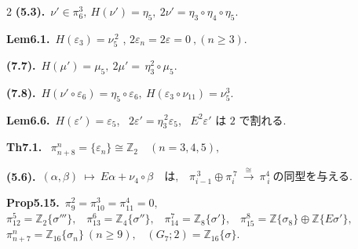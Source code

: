 \documentclass[10pt, leqno]{ltjsarticle}
\newcommand{\ov}[1]{\overline{#1}}
\newcommand{\gen}[1]{\{#1\}}       %
\newcommand{\pit}[2]{\pi_{#1}^{#2}}
\numberwithin{equation}{section}
\theoremstyle{plain}
\theoremstyle{definition}
\theoremstyle{remark}
\begin{document}
\begin{paracol}{2}
\noindent
\textbf{(5.3).}\
\(\nu'\in\pi_6^3,\ H(\nu')=\eta_5,\ 2\nu'=\eta_3\circ\eta_4\circ\eta_5 .\)

\noindent
\textbf{Lem6.1.}\
\(H(\varepsilon_3)=\nu_5^{\,2}\) , 
\(2\varepsilon_n=2\varepsilon=0\ ,(n\ge3)\). 

\noindent
\textbf{(7.7).}\
\(H(\mu')=\mu_{5},\ 2\mu'=\,\eta_{3}^{2}\circ \mu_{5} .\)

\noindent
\textbf{(7.8).}\
\(H(\nu'\circ \varepsilon_{6})=\eta_{5}\circ \varepsilon_{6},\
H(\varepsilon_{3}\circ \nu_{11})=\nu_{5}^{3} .\)

\noindent
\textbf{Lem6.6.}\
\(H(\varepsilon')=\varepsilon_{5}\), \
\(2\varepsilon'=\eta_{3}^{\,2}\varepsilon_{5}\), \
\(E^{2}\varepsilon'\) は $2$ で割れる. 

\noindent
\textbf{Th7.1.}\
\(\pit{n+8}{n}=\gen{\varepsilon_{n}}\cong\mathbb Z_{2}\quad (n=3,4,5),\)

\noindent
\textbf{(5.6).}\
\((\alpha,\beta)\ \longmapsto\ E\alpha+\nu_{4}\circ\beta
\quad\text{は,}\quad
\pi^{\,3}_{i-1}\oplus \pi^{\,7}_{i}\ \xrightarrow{\ \cong\ }\ \pi_{\,i}^{4}
\ \text{の同型を与える. }\)

\noindent
\textbf{Prop5.15.}\
\(\pi_9^2=\pi_{10}^3=\pi_{11}^4=0,\) \\
\(\pi^{5}_{12}=\mathbb Z_2\gen{\sigma'''},\) \
\(\pi^{6}_{13}=\mathbb Z_4\gen{\sigma''},\) \
\(\pi^{7}_{14}=\mathbb Z_8\gen{\sigma'},\) \
\(\pi^{8}_{15}=\mathbb Z\gen{\sigma_8}\oplus\mathbb Z\gen{E\sigma'},\) \\
\(\pi^{n}_{n+7}=\mathbb Z_{16}\gen{\sigma_n}\ (n\ge9),\) \
\((G_{7};2)=\mathbb Z_{16}\gen{\sigma}.\)


\end{paracol}
\end{document}
